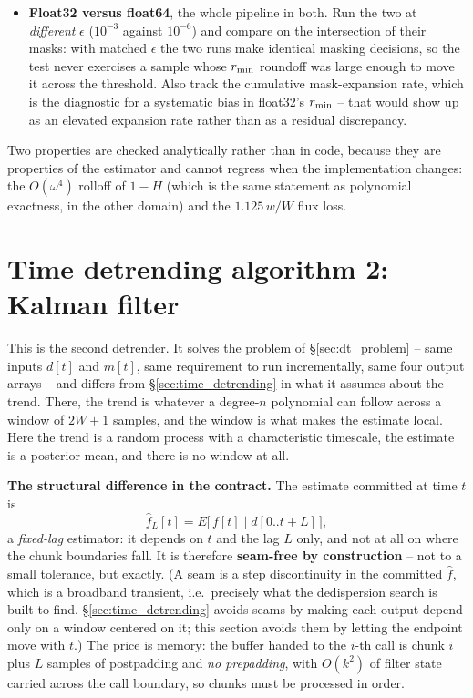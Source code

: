 \documentclass{article}
\numberwithin{equation}{section}   %
\begin{document}
\begin{itemize}
$r_{\rm min}$.
\item {\bf Float32 versus float64}, the whole pipeline in both.  Run the two at {\em different} $\epsilon$
($10^{-3}$ against $10^{-6}$) and compare on the intersection of their masks: with matched $\epsilon$ the two
runs make identical masking decisions, so the test never exercises a sample whose $r_{\rm min}$ roundoff was
large enough to move it across the threshold.  Also track the cumulative mask-expansion rate, which is the
diagnostic for a systematic bias in float32's $r_{\rm min}$ -- that would show up as an elevated expansion rate
rather than as a residual discrepancy.
\end{itemize}

Two properties are checked analytically rather than in code, because they are properties of the estimator and
cannot regress when the implementation changes: the $O(\omega^4)$ rolloff of $1-H$ (which is the same statement
as polynomial exactness, in the other domain) and the $1.125\,w/W$ flux loss.

\clearpage

\section{Time detrending algorithm 2: Kalman filter}
\label{sec:kalman_detrending}

This is the second detrender.  It solves the problem of \S\ref{sec:dt_problem} -- same inputs $d[t]$ and
$m[t]$, same requirement to run incrementally, same four output arrays -- and differs from
\S\ref{sec:time_detrending} in what it assumes about the trend.  There, the trend is whatever a degree-$n$
polynomial can follow across a window of $2W{+}1$ samples, and the window is what makes the estimate local.
Here the trend is a random process with a characteristic timescale, the estimate is a posterior mean, and
there is no window at all.

{\bf The structural difference in the contract.}  The estimate committed at time $t$ is
\begin{equation}
\hat f_L[t] = E\big[\, f[t] \;\big|\; d[0 .. t+L] \,\big] ,
\label{eq:kf_fixed_lag}
\end{equation}
a {\em fixed-lag} estimator: it depends on $t$ and the lag $L$ only, and not at all on where the chunk
boundaries fall.  It is therefore {\bf seam-free by construction} -- not to a small tolerance, but exactly.
(A seam is a step discontinuity in the committed $\hat f$, which is a broadband transient, i.e.~precisely
what the dedispersion search is built to find.  \S\ref{sec:time_detrending} avoids seams by making each
output depend only on a window centered on it; this section avoids them by letting the endpoint move with
$t$.)  The price is memory: the buffer handed to the $i$-th call is chunk $i$ plus $L$ samples of
postpadding and {\em no prepadding}, with $O(k^2)$ of filter state carried across the call boundary, so
chunks must be processed in order.
\end{document}
